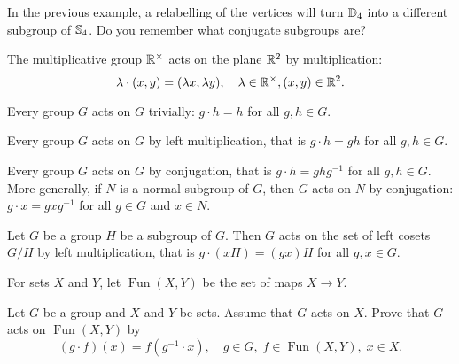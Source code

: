

In the previous example, a relabelling of the vertices 
will turn $\mathbb{D}_4$ into a different subgroup of $\mathbb{S}_4$. Do you remember 
what conjugate subgroups are? 

\begin{example}
    The multiplicative group $\mathbb{R}^{\times}$ acts on the plane $\mathbb{R}^2$ by multiplication: 
    \[ 
    \lambda\cdot (x,y)=(\lambda x,\lambda y),\quad \lambda\in\mathbb{R}^{\times},(x,y)\in\mathbb{R}^2.
    \]
\end{example}

\begin{example}
Every group $G$ acts on $G$ trivially: $g\cdot h=h$ for all $g,h\in G$.
\end{example}

\begin{example}
Every group $G$ acts on $G$ by left multiplication, that is
$g\cdot h=gh$ for all $g,h\in G$.
\end{example}

\begin{example}
Every group $G$ acts on $G$ by conjugation, that is
$g\cdot h=ghg^{-1}$ for all $g,h\in G$. More generally, 
if $N$ is a normal subgroup of $G$, then $G$ acts on
$N$ by conjugation: $g\cdot x=gx
g^{-1}$ for all $g\in G$ and $x\in N$. 
\end{example}

\begin{example}
Let $G$ be a group $H$ be a subgroup of $G$. Then $G$ 
acts on the set of left cosets $G/H$ by left multiplication, that 
is $g\cdot (xH)=(gx)H$ for all $g,x\in G$.
\end{example}

For sets $X$ and $Y$, let 
$\operatorname{Fun}(X,Y)$ be the set of maps $X\to Y$. 

\begin{exercise}
\label{xca:dual}
    Let $G$ be a group and $X$ and $Y$ be sets. Assume that $G$ acts on $X$. 
    Prove that 
    $G$ acts on $\operatorname{Fun}(X,Y)$ by 
    \[ 
        (g\cdot f)(x)=f(g^{-1}\cdot x),\quad g\in G,\; f\in\operatorname{Fun}(X,Y),\; x\in X.
    \]  
\end{exercise}

